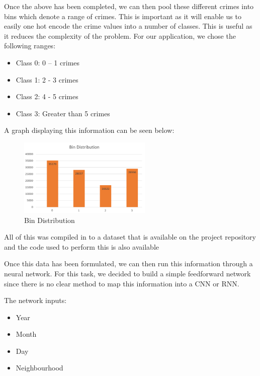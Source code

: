 \documentclass[conference]{IEEEtran}
\begin{document}
Once the above has been completed, we can then pool these different crimes into bins which denote a range of crimes.
This is important as it will enable us to easily one hot encode the crime values into a number of classes.
This is useful as it reduces the complexity of the problem. For our application, we chose the following ranges:\\

\begin{itemize}
  \item Class 0: 0 – 1 crimes
  \item Class 1: 2 - 3 crimes
  \item Class 2: 4 - 5 crimes
  \item Class 3: Greater than 5 crimes\\
\end{itemize}

A graph displaying this information can be seen below:

\begin{figure}[H]
  \centering
  \captionsetup{justification=centering}
  \centering
  \includegraphics[width=2.5in]{5.png}
  \caption{Bin Distribution}  
  \label{1}
\end{figure}

All of this was compiled in to a dataset that is available on the project repository \cite{bins} and the code used to perform
this is also available \cite{bin_code}

Once this data has been formulated, we can then run this information through a neural network.
For this task, we decided to build a simple feedforward network since there is no clear method to map this information
into a CNN or RNN.

The network inputs:

\begin{itemize}
  \item Year
  \item Month
  \item Day
  \item Neighbourhood\\
\end{itemize}
\end{document}
